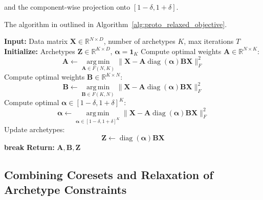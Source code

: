 \documentclass{article}
\begin{document}
and the component-wise projection onto $[1-\delta, 1+\delta]$.

The algorithm in outlined in Algorithm~\ref{alg:proto_relaxed_objective}.

\begin{algorithm}[H]
    \caption{Prototypical Algorithm for Objective with Relaxed Archetypal Constraints}
    \label{alg:proto_relaxed_objective}
    \begin{algorithmic}[1]
    \State \textbf{Input:} Data matrix $\mathbf{X} \in \mathbb{R}^{N \times D}$, number of archetypes $K$, max iterations $T$
    \State \textbf{Initialize:} Archetypes $\mathbf{Z} \in \mathbb{R}^{K \times D}$, $\boldsymbol{\alpha} = \mathbf{1}_K$
        \State Compute optimal weights $\mathbf{A} \in \mathbb{R}^{N \times K}$:
        \begin{equation}
        \mathbf{A} \gets \operatorname*{arg\,min}_{\mathbf{A} \in F(N, K)} \| {\mathbf{X}} - {\mathbf{A}} \operatorname{diag}(\boldsymbol{\alpha}) \mathbf{B} \mathbf{X} \|_F^2
        \end{equation}
        \State Compute optimal weights $\mathbf{B} \in \mathbb{R}^{K \times N}$:
        \begin{equation}
        \mathbf{B} \gets \operatorname*{arg\,min}_{\mathbf{B} \in F(K, N)} \| {\mathbf{X}} - {\mathbf{A}} \operatorname{diag}(\boldsymbol{\alpha}) \mathbf{B} \mathbf{X} \|_F^2
        \end{equation}
        \State Compute optimal $\boldsymbol{\alpha} \in [1-\delta, 1+\delta]^K$:
        \begin{equation}
        \boldsymbol{\alpha} \gets \operatorname*{arg\,min}_{\boldsymbol{\alpha} \in [1-\delta, 1+\delta]^K} \| {\mathbf{X}} - {\mathbf{A}} \operatorname{diag}(\boldsymbol{\alpha}) \mathbf{B} \mathbf{X} \|_F^2
        \end{equation}
        \State Update archetypes:
        \begin{equation}
        \mathbf{Z} \gets \operatorname{diag}(\boldsymbol{\alpha}) \mathbf{B} \mathbf{X}
        \end{equation}
            \State \textbf{break}
        \EndIf
    \EndFor
    \State \textbf{Return:} $\mathbf{A}, \mathbf{B}, \mathbf{Z}$
    \end{algorithmic}
\end{algorithm}

\subsection{Combining Coresets and Relaxation of Archetype Constraints}
\end{document}
